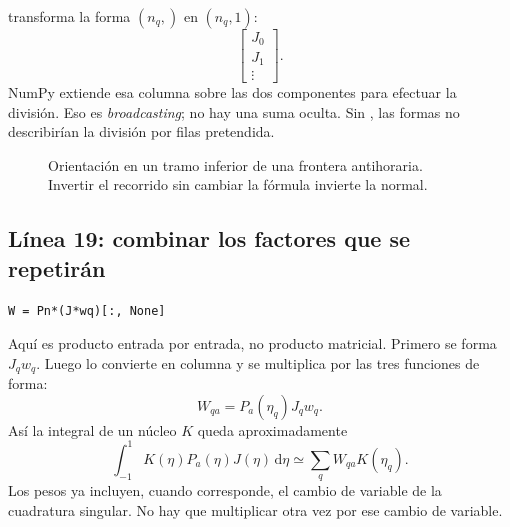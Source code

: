\documentclass[11pt,a4paper]{article}
\numberwithin{equation}{section}
\newcommand{\dd}{\,\mathrm{d}}
\DeclareRobustCommand{\code}[1]{\texttt{\detokenize{#1}}}
\begin{document}
\code{J[:,None]} transforma la forma $(n_q,)$ en $(n_q,1)$:
\begin{equation}
 \begin{bmatrix}J_0\\J_1\\\vdots\end{bmatrix}.
\end{equation}
NumPy extiende esa columna sobre las dos componentes para efectuar la
divisi\'on. Eso es \emph{broadcasting}; no hay una suma oculta.
Sin \code{None}, las formas no describir\'ian la divisi\'on
por filas pretendida.

\begin{figure}[htbp]
\centering
{}
\caption{Orientaci\'on en un tramo inferior de una frontera antihoraria.
Invertir el recorrido sin cambiar la f\'ormula invierte la normal.}
\end{figure}

\subsection{L\'inea 19: combinar los factores que se repetir\'an}
\begin{lstlisting}
W = Pn*(J*wq)[:, None]
\end{lstlisting}
Aqu\'i \code{*} es producto entrada por entrada, no producto matricial.
Primero se forma $J_qw_q$. Luego \code{[:,None]} lo convierte en
columna y se multiplica por las tres funciones de forma:
\begin{equation}
 \boxed{W_{qa}=P_a(\eta_q)J_qw_q.}
 \label{eq:W}
\end{equation}
As\'i la integral de un n\'ucleo $K$ queda aproximadamente
\begin{equation}
 \int_{-1}^1K(\eta)P_a(\eta)J(\eta)\dd\eta
       \simeq\sum_qW_{qa}K(\eta_q).
\end{equation}
Los pesos \code{wq} ya incluyen, cuando corresponde, el cambio de
variable de la cuadratura singular. No hay que multiplicar
otra vez por ese cambio de variable.
\end{document}
